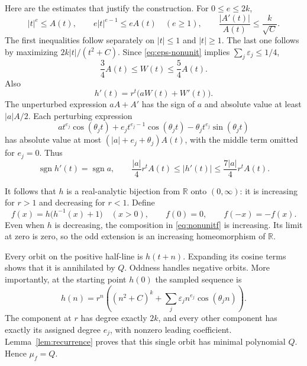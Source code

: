 \documentclass[11pt,letterpaper]{article}
\theoremstyle{definition}
\theoremstyle{remark}
\newcommand{\R}{\mathbb R}
\DeclareMathOperator{\sgn}{sgn}
\begin{document}
Here are the estimates that justify the construction. For
$0\le e\le2k$,
\begin{equation}
  |t|^e\le A(t),\qquad
  e|t|^{e-1}\le eA(t)\quad(e\ge1),\qquad
  \frac{|A'(t)|}{A(t)}\le\frac{k}{\sqrt C}.
  \label{eq:Abounds}
\end{equation}
The first inequalities follow separately on $|t|\le1$ and $|t|\ge1$.
The last one follows by maximizing $2k|t|/(t^2+C)$.
Since \eqref{eq:eps-nonunit} implies $\sum_j\varepsilon_j\le1/4$,
\begin{equation}
  \frac34A(t)\le W(t)\le\frac54A(t).
  \label{eq:Wbounds}
\end{equation}
Also
\begin{equation}
 h'(t)=r^t\bigl(aW(t)+W'(t)\bigr).
\end{equation}
The unperturbed expression $aA+A'$ has the sign of $a$ and absolute value
at least $|a|A/2$. Each perturbing expression
\begin{equation}
 a t^{e_j}\cos(\theta_jt)
   +e_jt^{e_j-1}\cos(\theta_jt)
   -\theta_jt^{e_j}\sin(\theta_jt)
\end{equation}
has absolute value at most $(|a|+e_j+\theta_j)A(t)$, with the middle term
omitted for $e_j=0$. Thus
\begin{equation}
 \sgn h'(t)=\sgn a,\qquad
 \frac{|a|}{4}r^tA(t)\le |h'(t)|\le\frac{7|a|}{4}r^tA(t).
 \label{eq:Hderiv}
\end{equation}

It follows that $h$ is a real-analytic bijection from $\R$ onto
$(0,\infty)$: it is increasing for $r>1$ and decreasing for $r<1$.
Define
\begin{equation}
  f(x)=h\bigl(h^{-1}(x)+1\bigr)\quad(x>0),\qquad
  f(0)=0,\qquad f(-x)=-f(x).
  \label{eq:nonunitf}
\end{equation}
Even when $h$ is decreasing, the composition in \eqref{eq:nonunitf} is
increasing. Its limit at zero is zero, so the odd extension is an
increasing homeomorphism of $\R$.

Every orbit on the positive half-line is $h(t+n)$. Expanding its cosine
terms shows that it is annihilated by $Q$. Oddness handles negative
orbits. More importantly, at the starting point $h(0)$ the sampled
sequence is
\begin{equation}
  h(n)=r^n\left((n^2+C)^k+
         \sum_j\varepsilon_j n^{e_j}\cos(\theta_jn)\right).
  \label{eq:fullorbit}
\end{equation}
The component at $r$ has degree exactly $2k$, and every other component
has exactly its assigned degree $e_j$, with nonzero leading coefficient.
Lemma~\ref{lem:recurrence} proves that this single orbit has minimal
polynomial $Q$. Hence $\mu_f=Q$.
\end{document}
